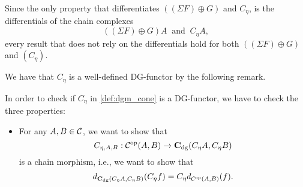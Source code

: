 \begin{remark}
    \label{rem:dgm_c_eta_similar_to_sigma_f_plus_g}
    Since the only property that differentiates \( ((\Sigma F) \oplus G) \) and \( C_{\eta} \), is the differentials of the chain complexes
    \[
        ((\Sigma F) \oplus G) A \: \text{ and } \: C_{\eta} A,
    \]
    every result that does not rely on the differentials hold for both \( ((\Sigma F) \oplus G)\) and \( (C_{\eta}) \).
\end{remark}

We have that \( C_{\eta} \) is a well-defined DG-functor by the following remark.
\begin{remark}
    In order to check if \( C_{\eta} \) in \autoref{def:dgm_cone} is a DG-functor, we have to check the three properties:
    \begin{itemize}
        \item {
            For any \( A, B \in {\mathcal{C}} \), we want to show that
            \[
                C_{\eta, A, B}: {\mathcal{C}}^{\operatorname{op}}(A, B) \to \operatorname{\mathbf{C}}_{\operatorname{dg}}(C_{\eta} A, C_{\eta} B)
            \]
            is a chain morphism, i.e., we want to show that
            \[
                d_{\operatorname{\mathbf{C}}_{\operatorname{dg}}(C_{\eta} A, C_{\eta} B)}(C_{\eta} f) = C_{\eta} d_{{\mathcal{C}}^{\operatorname{op}}(A, B)}(f).
            \]

}
\end{itemize}
\end{remark}
